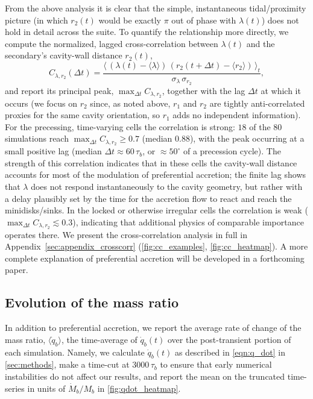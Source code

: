 \documentclass[fleqn,usenatbib]{mnras}
\begin{document}
From the above analysis it is clear that the simple, instantaneous tidal/proximity picture (in which $r_2(t)$ would be exactly $\pi$ out of phase with $\lambda(t)$) does not hold in detail across the suite. To quantify the relationship more directly, we compute the normalized, lagged cross-correlation between $\lambda(t)$ and the secondary's cavity-wall distance $r_2(t)$,
\begin{equation}\label{eqn:crosscorr}
    C_{\lambda, r_2}(\Delta t) = \frac{\big\langle \, (\lambda(t) - \langle\lambda\rangle)\,(r_2(t+\Delta t) - \langle r_2\rangle) \, \big\rangle_t}{\sigma_\lambda \, \sigma_{r_2}},
\end{equation}
and report its principal peak, $\max_{\Delta t} C_{\lambda, r_2}$, together with the lag $\Delta t$ at which it occurs (we focus on $r_2$ since, as noted above, $r_1$ and $r_2$ are tightly anti-correlated proxies for the same cavity orientation, so $r_1$ adds no independent information). For the precessing, time-varying cells the correlation is strong: $18$ of the $80$ simulations reach $\max_{\Delta t} C_{\lambda, r_2} \ge 0.7$ (median $0.88$), with the peak occurring at a small positive lag (median $\Delta t \approx 60\,\tau_b$, or $\approx 50^\circ$ of a precession cycle). The strength of this correlation indicates that in these cells the cavity-wall distance accounts for most of the modulation of preferential accretion; the finite lag shows that $\lambda$ does not respond instantaneously to the cavity geometry, but rather with a delay plausibly set by the time for the accretion flow to react and reach the minidisks/sinks. In the locked or otherwise irregular cells the correlation is weak ($\max_{\Delta t} C_{\lambda, r_2} \lesssim 0.3$), indicating that additional physics of comparable importance operates there. We present the cross-correlation analysis in full in Appendix~\ref{sec:appendix_crosscorr} (\autoref{fig:cc_examples}, \autoref{fig:cc_heatmap}). A more complete explanation of preferential accretion will be developed in a forthcoming paper.



\subsection{Evolution of the mass ratio}\label{sec:mass_ratio}
In addition to preferential accretion, we report the average rate of change of the mass ratio, $\langle \dot{q}_b \rangle$, the time-average of $\dot{q}_b(t)$ over the post-transient portion of each simulation. Namely, we calculate $\dot{q}_b(t)$ as described in \autoref{eqn:q_dot} in \autoref{sec:methods}, make a time-cut at $3000\,\tau_b$ to ensure that early numerical instabilities do not affect our results, and report the mean on the truncated time-series in units of $\dot{M}_b/M_b$ in \autoref{fig:qdot_heatmap}.
\end{document}
